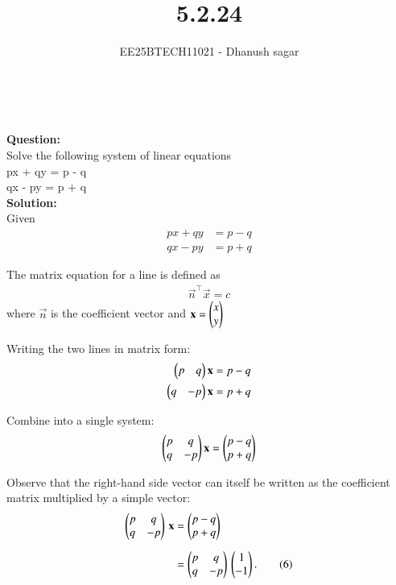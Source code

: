 \documentclass[journal]{IEEEtran}
\begin{document}


\title{5.2.24}
\author{EE25BTECH11021 - Dhanush sagar}
\maketitle \vspace{-1cm}
\renewcommand{\thefigure}{\theenumi}
\renewcommand{\thetable}{\theenumi}
\setlength{\intextsep}{10pt} %

\
\renewcommand{\thetable}{\theenumi}

\textbf{Question:} \\
Solve the following system of linear equations\\

px + qy = p - q \\
qx - py = p + q \\


\textbf{Solution:} \\
Given
\begin{align}
px + qy &= p - q \\
qx - py &= p + q
\end{align}

The matrix equation for a line is defined as
\begin{align}
\vec{n}^\top \vec{x} = c
\end{align}
where $\vec{n}$ is the coefficient vector and $\mathbf{x} = \begin{pmatrix}x\\y\end{pmatrix}$

Writing the two lines in matrix form:
\begin{align}
\begin{pmatrix}p & q\end{pmatrix} \mathbf{x} = p - q \\
\begin{pmatrix}q & -p\end{pmatrix} \mathbf{x} = p + q
\end{align}

Combine into a single system:
\begin{align}
\begin{pmatrix}p & q \\ q & -p\end{pmatrix} \mathbf{x} = \begin{pmatrix}p-q \\ p+q\end{pmatrix}
\end{align}

\noindent
Observe that the right-hand side vector can itself be written as the coefficient 
matrix multiplied by a simple vector:
\begin{align}
\begin{pmatrix}p & q\\ q & -p\end{pmatrix}\,\mathbf{x}
&= \begin{pmatrix}p-q\\ p+q\end{pmatrix} \\[6pt]
&= \begin{pmatrix}p & q\\ q & -p\end{pmatrix}\,\begin{pmatrix}1\\ -1\end{pmatrix}. \tag{6}
\end{align}
\end{document}

